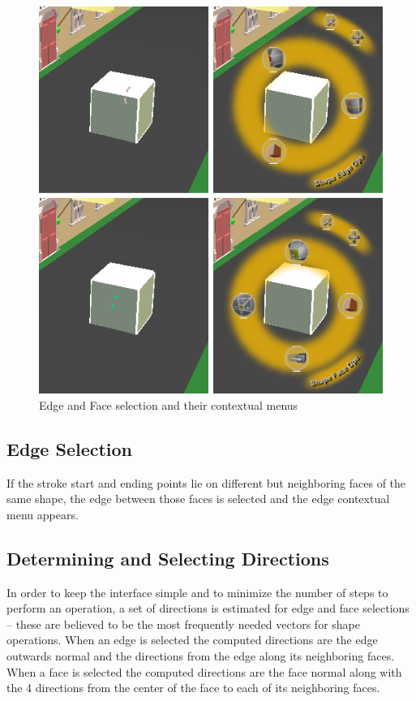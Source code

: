 \begin{figure}[ht]
	\centering
		\includegraphics[scale=0.5]{gfx/face-edge-selection-imp.png}
	\caption{Edge and Face selection and their contextual menus}
	\label{fig:face-edge-selection-imp}
\end{figure}



\subsection{Edge Selection}

If the stroke start and ending points lie on different but neighboring faces of the same shape, the edge between
those faces is selected and the edge contextual menu appears.


\subsection{Determining and Selecting Directions}

In order to keep the interface simple and to minimize the number of steps to perform an operation, a set of directions
is estimated for edge and face selections -- these are believed to be the most frequently needed vectors for shape operations.
When an edge is selected the computed directions are the edge outwards normal and the directions from the edge along its neighboring faces.
When a face is selected the computed directions are the face normal along with the 4 directions from the center of the face
to each of its neighboring faces.

